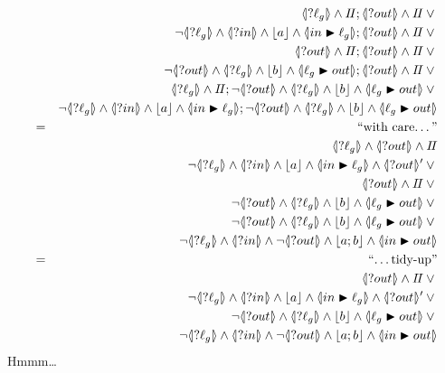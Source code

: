 \begin{eqnarray*}
  &&
     \LS{\ell_g} \land \Skip ; \LS{out} \land \Skip \lor{}
\\&& \lnot \LS{\ell_g}
           \land \LS{in} \land \ado a \land \LUPD{in}{\ell_g}
            ; \LS{out} \land \Skip\lor {}
\\&& \LS{out} \land \Skip ;\LS{out} \land \Skip\lor {}
\\&&\lnot \LS{out}
           \land \LS{\ell_g} \land \ado b \land \LUPD{\ell_g}{out} 
           ; \LS{out} \land \Skip \lor {}
\\&&
     \LS{\ell_g} \land \Skip 
     ; \lnot \LS{out}
       \land \LS{\ell_g} \land \ado b \land \LUPD{\ell_g}{out} \lor{}
\\&& \lnot \LS{\ell_g}
           \land \LS{in} \land \ado a \land \LUPD{in}{\ell_g} 
            ; \lnot \LS{out}
       \land \LS{\ell_g} \land \ado b \land \LUPD{\ell_g}{out}
\EQ{with care\dots}
\\&&\LS{\ell_g} \land\LS{out} \land \Skip
\\&& \lnot \LS{\ell_g}
           \land \LS{in} \land \ado a \land \LUPD{in}{\ell_g}
            \land \LSd{out} \lor {}
\\&& \LS{out} \land \Skip  \lor {}
\\&&\lnot \LS{out}
           \land \LS{\ell_g} \land \ado b \land \LUPD{\ell_g}{out}
           \lor {}
\\&& \lnot \LS{out}
       \land \LS{\ell_g} \land \ado b \land \LUPD{\ell_g}{out} \lor{}
\\&& \lnot \LS{\ell_g} \land \LS{in} \land \lnot\LS{out}
    \land \ado{a;b}\land \LUPD{in}{out}
\EQ{\ldots tidy-up}
\\&& \LS{out} \land \Skip \lor {}
\\&& \lnot \LS{\ell_g}
           \land \LS{in} \land \ado a \land \LUPD{in}{\ell_g}
            \land \LSd{out} \lor {}
\\&& \lnot \LS{out}
       \land \LS{\ell_g} \land \ado b \land \LUPD{\ell_g}{out} \lor{}
\\&& \lnot \LS{\ell_g} \land \LS{in} \land \lnot\LS{out}
    \land \ado{a;b}\land \LUPD{in}{out}
\end{eqnarray*} Hmmm\dots

